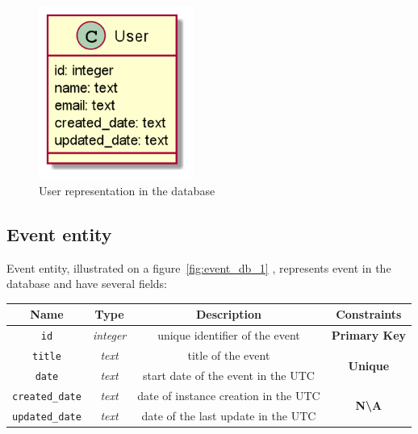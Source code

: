 \begin{figure}[h]
    \label{fig:user_db_1}
    \centering
    \includegraphics[width=0.45\textwidth]{images/user}
    \caption{User representation in the database}
\end{figure}

\subsection{Event entity}\label{subsec:event-entity}

Event entity, illustrated on a figure~\ref{fig:event_db_1} , represents event in the database and have several fields:

\begin{center}
    \begin{tabular}{ | c | c | c | c |}
        \hline
        \textbf{Name}          & \textbf{Type}    & \textbf{Description}                 & \textbf{Constraints}                         \\ \hline
        \texttt{id}            & \textit{integer} & unique identifier of the event       & \textbf{\color{red}Primary Key}              \\ \hline
        \texttt{title}         & \textit{text}    & title of the event                   & \multirow{2}{*}{\textbf{\color{blue}Unique}} \\ \cline{0-2}
        \texttt{date}          & \textit{text}    & start date of the event in the UTC   &                                              \\ \hline
        \texttt{created\_date} & \textit{text}    & date of instance creation in the UTC & \multirow{2}{*}{\textbf{N\textbackslash{A}}} \\ \cline{0-2}
        \texttt{updated\_date} & \textit{text}    & date of the last update in the UTC   &                                              \\ \hline
    \end{tabular}
\end{center}

